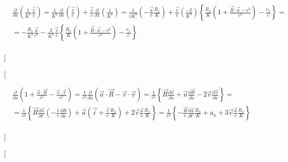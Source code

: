 \documentclass[11pt]{article}
\begin{document}
\begin{align}
  & \frac{\partial }{\partial x}\left( \frac{1}{{{K}^{2}}}\frac{\overrightarrow{v}}{c} \right)=\frac{1}{{{K}^{2}}}\frac{\partial }{\partial x}\left( \frac{\overrightarrow{v}}{c} \right)+\frac{\overrightarrow{v}}{c}\frac{\partial }{\partial x}\left( \frac{1}{{{K}^{2}}} \right)=\frac{1}{c{{K}^{2}}}\left( -\frac{\overrightarrow{a}}{c}\frac{{{R}_{x}}}{K} \right)+\frac{\overrightarrow{v}}{c}\left( \frac{-2}{{{K}^{3}}} \right)\left\{ \frac{{{R}_{x}}}{K}\left( 1+\frac{\overrightarrow{R}\cdot \overrightarrow{a}-{{v}^{2}}}{{{c}^{2}}} \right)-\frac{{{v}_{x}}}{c} \right\}= \\ 
 & =-\frac{{{R}_{x}}}{{{K}^{3}}}\frac{\overrightarrow{a}}{{{c}^{2}}}-\frac{2}{{{K}^{3}}}\frac{\overrightarrow{v}}{c}\left\{ \frac{{{R}_{x}}}{K}\left( 1+\frac{\overrightarrow{R}\cdot \overrightarrow{a}-{{v}^{2}}}{{{c}^{2}}} \right)-\frac{{{v}_{x}}}{c} \right\} \\ 
\end{align}

{]}

{[}

\begin{align}
  & \frac{\partial }{\partial x}\left( 1+\frac{\overrightarrow{a}\cdot \overrightarrow{R}}{{{c}^{2}}}-\frac{\overrightarrow{v}\cdot \overrightarrow{v}}{{{c}^{2}}} \right)=\frac{1}{{{c}^{2}}}\frac{\partial }{\partial x}\left( \overrightarrow{a}\cdot \overrightarrow{R}-\overrightarrow{v}\cdot \overrightarrow{v} \right)=\frac{1}{{{c}^{2}}}\left\{ \overrightarrow{R}\frac{\partial \overrightarrow{a}}{\partial x}+\overrightarrow{a}\frac{\partial \overrightarrow{R}}{\partial x}-2\overrightarrow{v}\frac{\partial \overrightarrow{v}}{\partial x} \right\}= \\ 
 & =\frac{1}{{{c}^{2}}}\left\{ \overrightarrow{R}\frac{\partial \overrightarrow{a}}{\partial t'}\left( -\frac{1}{c}\frac{\partial R}{\partial x} \right)+\overrightarrow{a}\left( \overrightarrow{i}+\frac{\overrightarrow{v}}{c}\frac{{{R}_{x}}}{K} \right)+2\overrightarrow{v}\frac{\overrightarrow{a}}{c}\frac{{{R}_{x}}}{K} \right\}=\frac{1}{{{c}^{2}}}\left\{ -\frac{\overrightarrow{R}}{c}\frac{\partial \overrightarrow{a}}{\partial t'}\frac{{{R}_{x}}}{K}+{{a}_{x}}+3\overrightarrow{v}\frac{\overrightarrow{a}}{c}\frac{{{R}_{x}}}{K} \right\} \\ 
\end{align}

{]}

{[}
\end{document}
